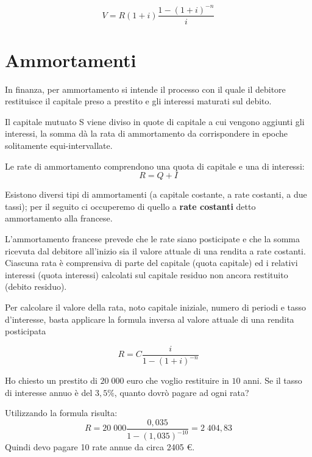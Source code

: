 \begin{definizione}
\[ V=R(1+i)\dfrac{1-(1+i)^{-n}}{i} \]
\end{definizione}

\section{Ammortamenti}
In finanza, per ammortamento si intende il processo con il quale il 
debitore restituisce il capitale preso a prestito e gli interessi maturati 
sul debito.

Il capitale mutuato S viene diviso in quote di capitale a cui vengono 
aggiunti gli interessi, la somma dà la rata di ammortamento da 
corrispondere in epoche solitamente equi-intervallate.

Le rate di ammortamento comprendono una quota di capitale e una di 
interessi: 
\[R=Q+I\]

Esistono diversi tipi di ammortamenti (a capitale costante, a rate 
costanti, a due tassi); per il seguito ci occuperemo di quello a 
\textbf{rate costanti} detto ammortamento alla francese.

L'ammortamento francese prevede che le rate siano posticipate e che la 
somma ricevuta dal debitore all'inizio sia il valore attuale di una rendita 
a rate costanti. Ciascuna rata è comprensiva di parte del capitale (quota 
capitale) ed i relativi interessi (quota interessi) calcolati sul capitale 
residuo non ancora restituito (debito residuo). 

Per calcolare il valore della rata, noto capitale iniziale, numero di 
periodi e tasso d'interesse, basta applicare la formula inversa al valore 
attuale di una rendita posticipata 

\begin{definizione}[Rata]
\[ R=C\dfrac{i}{1-(1+i)^{-n}}\]
\end{definizione}

\begin{exrig}
\begin{esempio}
Ho chiesto un prestito di \(20\;000\) euro che voglio restituire in \(10\) 
anni. 
Se il tasso di interesse annuo è del \(3,5\%\), quanto dovrò pagare ad ogni 
rata?

Utilizzando la formula risulta:
\[ R=20\;000\dfrac{0,035}{1-(1,035)^{-10}}=2\;404,83\]
Quindi devo pagare 10 rate annue da circa 2405 €.
\end{esempio}
\end{exrig}

